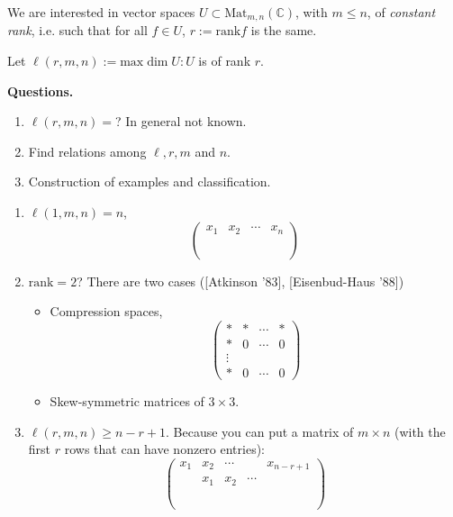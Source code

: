 \medskip\noindent

We are interested in vector spaces $U \subset
\text{Mat}_{m,n}(\mathbb{C})$,
with $m \leq n$, of {\it constant rank}, i.e.
such that for all $f \in U$,
$r:=\text{rank}f$ is the same.

Let $\ell(r,m,n):=\text{max}\dim U:U$ is of
rank $r$.

\medskip\noindent
{\bf Questions.}
\begin{enumerate}
\item $\ell(r,m,n)=$? In general not known.
\item Find relations among $\ell, r,m$ and
$n$.
\item Construction of examples and
classification.
\end{enumerate}

\begin{example}
\label{example-what-we-know}
\begin{enumerate}
\item $\ell(1,m,n)=n$,
$$
\begin{pmatrix}
x_1&x_2&\cdots &x_n\\
\\
\\
\\
\end{pmatrix}
$$
\item $\text{rank}=2$? There are two cases
([Atkinson '83], [Eisenbud-Haus '88])
\begin{itemize}
\item Compression spaces,
$$
\begin{pmatrix}
*&*&\cdots &*\\
*&0&\cdots & 0\\
\vdots &\\
*&0&\cdots&0
\end{pmatrix}
$$
\item Skew-symmetric matrices of $3 \times
3$.
\end{itemize}
\item $\ell(r,m,n) \geq n-r+1$. Because you
can put a matrix of
$m\times n$ (with the first $r$ rows that can
have nonzero entries):
$$
\begin{pmatrix}
x_1 &  x_2 &  \cdots & & x_{n-r+1}\\
& x_1 & x_2 & \cdots &\\
\\
\\
\\
\end{pmatrix}
$$
\end{enumerate}
\end{example}

